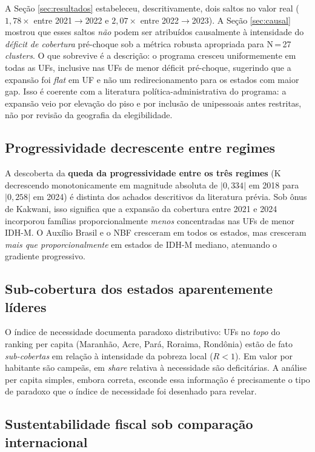 \documentclass[12pt,a4paper,oneside]{article}
\begin{document}
A Seção \ref{sec:resultados} estabeleceu, descritivamente, dois
saltos no valor real ($1,78\times$ entre 2021$\to$2022 e
$2,07\times$ entre 2022$\to$2023). A Seção \ref{sec:causal} mostrou que esses saltos
\textit{não} podem ser atribuídos causalmente à intensidade do
\textit{déficit de cobertura} pré-choque sob a métrica robusta
apropriada para N\,=\,27 \textit{clusters}. O que sobrevive é a
descrição: o programa cresceu uniformemente em todas as UFs,
inclusive nas UFs de menor déficit pré-choque, sugerindo que a
expansão foi \textit{flat} em UF e não um redirecionamento para os
estados com maior gap. Isso é coerente com a literatura
política-administrativa do programa: a expansão veio por elevação
do piso e por inclusão de unipessoais antes restritas, não por
revisão da geografia da elegibilidade.

\subsection{Progressividade decrescente entre regimes}

A descoberta da \textbf{queda da progressividade entre os três
regimes} (K decrescendo monotonicamente em magnitude absoluta de
$|0,334|$ em 2018 para $|0,258|$ em 2024) é distinta dos achados
descritivos da literatura prévia. Sob ônus de Kakwani, isso
significa que a expansão da cobertura entre 2021 e 2024 incorporou
famílias proporcionalmente \textit{menos} concentradas nas UFs de
menor IDH-M. O Auxílio Brasil e o NBF cresceram em todos os
estados, mas cresceram \textit{mais que proporcionalmente} em
estados de IDH-M mediano, atenuando o gradiente progressivo.

\subsection{Sub-cobertura dos estados aparentemente líderes}

O índice de necessidade documenta paradoxo distributivo: UFs no
\textit{topo} do ranking per capita (Maranhão, Acre, Pará, Roraima,
Rondônia) estão de fato \textit{sub-cobertas} em relação à
intensidade da pobreza local ($R < 1$). Em valor por habitante são
campeãs, em \textit{share} relativa à necessidade são deficitárias.
A análise per capita simples, embora correta, esconde essa
informação \textemdash{} é precisamente o tipo de paradoxo que o
índice de necessidade foi desenhado para revelar.

\subsection{Sustentabilidade fiscal sob comparação internacional}
\end{document}
